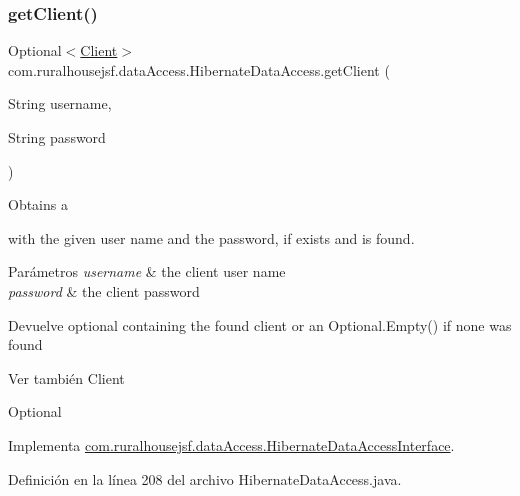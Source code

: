 \subsubsection{\texorpdfstring{getClient()}{getClient()}}
{\footnotesize\ttfamily Optional$<$\mbox{\hyperlink{classcom_1_1ruralhousejsf_1_1domain_1_1_client}{Client}}$>$ com.\+ruralhousejsf.\+data\+Access.\+Hibernate\+Data\+Access.\+get\+Client (\begin{DoxyParamCaption}\item[{String}]{username,  }\item[{String}]{password }\end{DoxyParamCaption})}

Obtains a
\begin{DoxyCode}{0}
\end{DoxyCode}
 with the given user name and the password, if exists and is found.


\begin{DoxyParams}{Parámetros}
{\em username} & the client user name \\
\hline
{\em password} & the client password\\
\hline
\end{DoxyParams}
\begin{DoxyReturn}{Devuelve}
optional containing the found client or an {\ttfamily Optional.\+Empty()} if none was found
\end{DoxyReturn}
\begin{DoxySeeAlso}{Ver también}
Client 

Optional 
\end{DoxySeeAlso}


Implementa \mbox{\hyperlink{interfacecom_1_1ruralhousejsf_1_1data_access_1_1_hibernate_data_access_interface_abf581529aefd317dffd1d2ca0906c3ac}{com.\+ruralhousejsf.\+data\+Access.\+Hibernate\+Data\+Access\+Interface}}.



Definición en la línea 208 del archivo Hibernate\+Data\+Access.\+java.

\mbox{\label{classcom_1_1ruralhousejsf_1_1data_access_1_1_hibernate_data_access_a54bd9542b20644ccd47961ca260d17b4}} 
